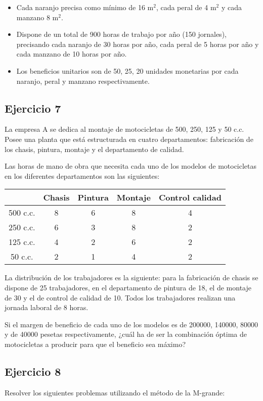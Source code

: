 \begin{itemize}
    \item Cada naranjo precisa como mínimo de 16 m$^2$, cada peral de 4 m$^2$ y cada manzano 8 m$^2$.
    \item Dispone de un total de 900 horas de trabajo por año (150 jornales), precisando cada naranjo de 30 horas por año, cada peral de 5 horas por año y cada manzano de 10 horas por año.
    \item Los beneficios unitarios son de 50, 25, 20 unidades monetarias por cada naranjo, peral y manzano respectivamente.
\end{itemize}

\subsection*{Ejercicio 7}
La empresa A se dedica al montaje de motocicletas de 500, 250, 125 y 50 c.c. Posee una planta que está estructurada en cuatro departamentos: fabricación de los chasis, pintura, montaje y el departamento de calidad.

Las horas de mano de obra que necesita cada uno de los modelos de motocicletas en los diferentes departamentos son las siguientes:

\begin{table}[H]
\centering
\begin{tabular}{|c|c|c|c|c|}
\hline
 & Chasis & Pintura & Montaje & Control calidad \\
\hline
500 c.c. & 8 & 6 & 8 & 4 \\
250 c.c. & 6 & 3 & 8 & 2 \\
125 c.c. & 4 & 2 & 6 & 2 \\
50 c.c. & 2 & 1 & 4 & 2 \\
\hline
\end{tabular}
\end{table}

La distribución de los trabajadores es la siguiente: para la fabricación de chasis se dispone de 25 trabajadores, en el departamento de pintura de 18, el de montaje de 30 y el de control de calidad de 10. Todos los trabajadores realizan una jornada laboral de 8 horas.

Si el margen de beneficio de cada uno de los modelos es de 200000, 140000, 80000 y de 40000 pesetas respectivamente, ¿cuál ha de ser la combinación óptima de motocicletas a producir para que el beneficio sea máximo?

\subsection*{Ejercicio 8}
Resolver los siguientes problemas utilizando el método de la M-grande:

